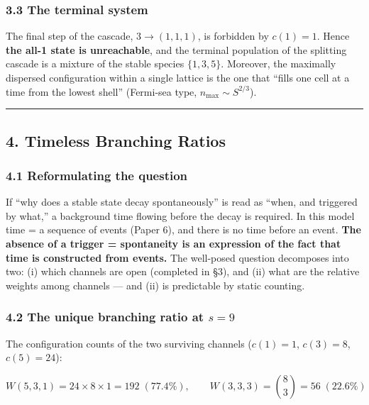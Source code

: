 \documentclass[
]{article}
\begin{document}
\subsubsection{3.3 The terminal system}\label{the-terminal-system}

The final step of the cascade, \(3\to(1,1,1)\), is forbidden by
\(c(1)=1\). Hence \textbf{the all-1 state is unreachable}, and the
terminal population of the splitting cascade is a mixture of the stable
species \(\{1,3,5\}\). Moreover, the maximally dispersed configuration
within a single lattice is the one that ``fills one cell at a time from
the lowest shell'' (Fermi-sea type, \(n_{\max}\sim S^{2/3}\)).

\begin{center}\rule{0.5\linewidth}{0.5pt}\end{center}

\subsection{4. Timeless Branching
Ratios}\label{timeless-branching-ratios}

\subsubsection{4.1 Reformulating the
question}\label{reformulating-the-question}

If ``why does a stable state decay spontaneously'' is read as ``when,
and triggered by what,'' a background time flowing before the decay is
required. In this model time = a sequence of events (Paper 6), and there
is no time before an event. \textbf{The absence of a trigger =
spontaneity is an expression of the fact that time is constructed from
events.} The well-posed question decomposes into two: (i) which channels
are open (completed in §3), and (ii) what are the relative weights among
channels --- and (ii) is predictable by static counting.

\subsubsection{\texorpdfstring{4.2 The unique branching ratio at
\(s=9\)}{4.2 The unique branching ratio at s=9}}\label{the-unique-branching-ratio-at-s9}

The configuration counts of the two surviving channels (\(c(1)=1\),
\(c(3)=8\), \(c(5)=24\)):

\[
W(5,3,1)=24\times8\times1=192\;(77.4\%),\qquad
W(3,3,3)=\binom{8}{3}=56\;(22.6\%)
\]
\end{document}
